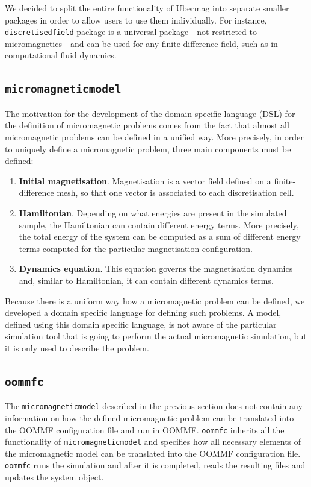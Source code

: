 \documentclass{deliverablereport}
\begin{document}
We decided to split the entire functionality of Ubermag into separate
smaller packages in order to allow users to use them individually. For
instance, \texttt{discretisedfield} package is a universal package -
not restricted to micromagnetics - and can be used for any
finite-difference field, such as in computational fluid dynamics.

\subsection{\texttt{micromagneticmodel}}\label{sec:micromagneticmodel}

The motivation for the development of the domain specific language
(DSL) for the definition of micromagnetic problems comes from the fact
that almost all micromagnetic problems can be defined in a unified
way. More precisely, in order to uniquely define a micromagnetic
problem, three main components must be defined:

\begin{enumerate}
\item \textbf{Initial magnetisation}. Magnetisation is a vector
field defined on a finite-difference mesh, so that one vector is
associated to each discretisation cell.
\item \textbf{Hamiltonian}. Depending on what energies are present in
the simulated sample, the Hamiltonian can contain different energy
terms. More precisely, the total energy of the system can be computed
as a sum of different energy terms computed for the particular
magnetisation configuration.
\item \textbf{Dynamics equation}. This equation governs the
magnetisation dynamics and, similar to Hamiltonian, it can contain
different dynamics terms.
\end{enumerate}

Because there is a uniform way how a micromagnetic problem can be
defined, we developed a domain specific language for defining such
problems. A model, defined using this domain specific language, is not
aware of the particular simulation tool that is going to perform the
actual micromagnetic simulation, but it is only used to describe the
problem.

\subsection{\texttt{oommfc}}\label{sec:oommfc}

The \texttt{micromagneticmodel} described in the previous section does not
contain any information on how the defined micromagnetic problem can
be translated into the OOMMF configuration file and run in
OOMMF. \texttt{oommfc} inherits all the functionality of
\texttt{micromagneticmodel} and specifies how all necessary elements
of the micromagnetic model can be translated into the OOMMF
configuration file. \texttt{oommfc} runs the simulation and after it
is completed, reads the resulting files and updates the system object.
\end{document}
